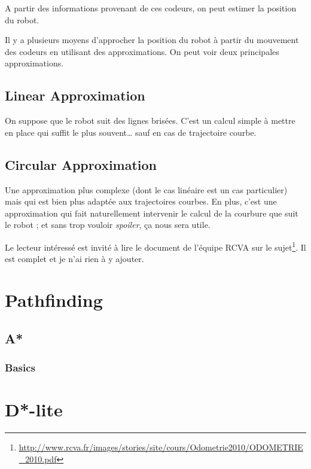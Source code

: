 \documentclass[11pt]{article}
\begin{document}
    A partir des informations provenant de ces codeurs, on peut estimer la position du robot.

    Il y a plusieurs moyens d'approcher la position du robot à partir du mouvement des codeurs en utilisant des approximations. On peut voir deux principales approximations.

    \subsection{Linear Approximation}\label{subsec:linearApproximation}

    On suppose que le robot suit des lignes brisées. C'est un calcul simple à mettre en place qui suffit le plus souvent… sauf en cas de trajectoire courbe.

    \subsection{Circular Approximation}\label{subsec:circularApproximation}

    Une approximation plus complexe (dont le cas linéaire est un cas particulier) mais qui est bien plus adaptée aux trajectoires courbes. En plus, c'est une approximation qui fait naturellement intervenir le calcul de la courbure que suit le robot ; et sans trop vouloir \textit{spoiler}, ça nous sera utile.

    Le lecteur intéressé est invité à lire le document de l'équipe RCVA sur le sujet\cite{odorcva}\footnote{\url{http://www.rcva.fr/images/stories/site/cours/Odometrie2010/ODOMETRIE\_2010.pdf}}. Il est complet et je n'ai rien à y ajouter.



    \section{Pathfinding}\label{sec:pathfinding}

    \subsection{A*}\label{subsec:a*}
    \subsubsection{Basics}

    \section{D*-lite}\label{sec:d*-lite}
\end{document}

